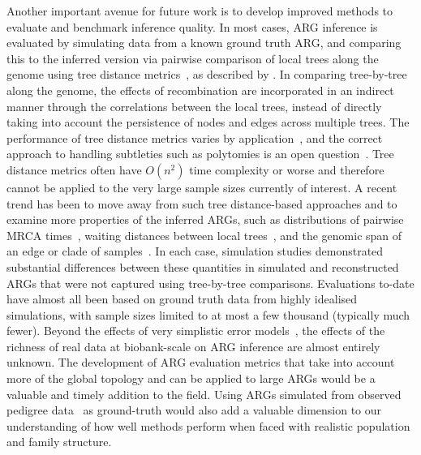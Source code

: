 \documentclass[9pt,twocolumn,twoside]{gsajnl}
\begin{document}
Another important avenue for future work is to develop improved methods 
to evaluate and benchmark inference quality.
In most cases,
ARG inference is evaluated by simulating data from a known ground truth ARG,
and comparing this to the inferred version via pairwise comparison of
local trees along the genome using tree distance
metrics~\citep[e.g.][]{robinson1981comparison,kendall2016mapping},
as described by \citet{kuhner2015assessing}.
In comparing tree-by-tree along the genome, the effects of recombination
are incorporated in an indirect manner through the correlations
between the local trees, instead of directly taking into account
the persistence of nodes and edges across multiple trees.
The performance of tree distance metrics varies by
application~\citep{kuhner2015practical}, and the correct approach
to handling subtleties such as polytomies
is an open question~\citep{kelleher2019inferring,zhang2023biobank}.
Tree distance metrics often have $O(n^2)$ time complexity or worse
and therefore cannot be
applied to the very large sample sizes currently of interest.
A recent trend has been to move away from such
tree distance-based approaches and to examine more
properties of the inferred ARGs, such as
distributions of pairwise MRCA times~\citep{brandt2021evaluation},
waiting distances between local trees~\citep{deng2021distribution},
and the genomic span of an edge or clade of
samples~\citep{ignatieva2023distribution}.
In each case, simulation studies demonstrated
substantial differences between these quantities in simulated and
reconstructed ARGs
that were not captured using tree-by-tree comparisons.
Evaluations to-date have almost all been based
on ground truth data from highly idealised simulations,
with sample sizes limited to at most a few thousand (typically much fewer).
Beyond the effects of very simplistic error models~\cite[e.g.][]{kelleher2019inferring},
the effects of the richness of real data
at biobank-scale on ARG inference are almost entirely unknown.
The development of ARG evaluation metrics that take into account more of the
global topology and can be applied to large ARGs would be a
valuable and timely addition to the field.
Using ARGs simulated from observed pedigree data~\citep{anderson2022genes} as
ground-truth would also add a valuable dimension to
our understanding of how well methods perform when faced with
realistic population and family structure.
\end{document}
